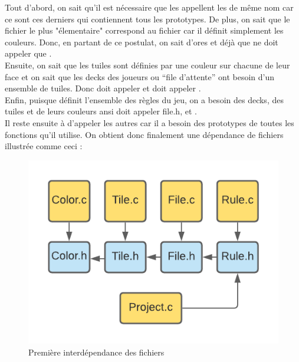 \documentclass[a4paper]{article}
\begin{document}
Tout d'abord, on sait qu'il est nécessaire que les  appellent les  de même nom car ce sont ces derniers qui contiennent tous les prototypes. De plus, on sait que le fichier le plus "élementaire" correspond au fichier  car il définit simplement les couleurs. Donc, en partant de ce postulat, on sait d'ores et déjà que  ne doit appeler que . \\
Ensuite, on sait que les tuiles sont définies par une couleur sur chacune de leur face et on sait que les decks des joueurs ou ``file d'attente'' ont besoin d'un ensemble de tuiles. Donc  doit appeler  et  doit appeler . \\
Enfin, puisque  définit l'ensemble des règles du jeu, on a besoin des decks, des tuiles et de leurs couleurs ansi  doit appeler file.h,  et . \\
Il reste ensuite à  d'appeler les autres  car il a besoin des prototypes de toutes les fonctions qu'il utilise.
On obtient donc finalement une dépendance de fichiers illustrée comme ceci : \\

\newpage

\begin{figure}[h!]
  \centering
  \includegraphics[scale = 0.75]{fichiers1.png}

  \caption{Première interdépendance des fichiers}
  \label{fichier1}
\end{figure}
\end{document}
